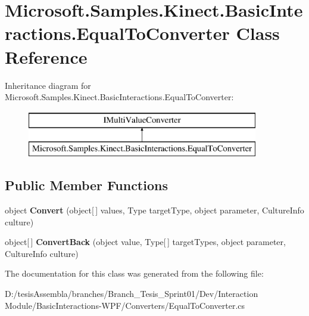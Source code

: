 \hypertarget{class_microsoft_1_1_samples_1_1_kinect_1_1_basic_interactions_1_1_equal_to_converter}{\section{Microsoft.\-Samples.\-Kinect.\-Basic\-Interactions.\-Equal\-To\-Converter Class Reference}
\label{class_microsoft_1_1_samples_1_1_kinect_1_1_basic_interactions_1_1_equal_to_converter}
}
Inheritance diagram for Microsoft.\-Samples.\-Kinect.\-Basic\-Interactions.\-Equal\-To\-Converter\-:\begin{figure}[H]
\begin{center}
\leavevmode
\includegraphics[height=2.000000cm]{class_microsoft_1_1_samples_1_1_kinect_1_1_basic_interactions_1_1_equal_to_converter}
\end{center}
\end{figure}
\subsection*{Public Member Functions}
\begin{DoxyCompactItemize}
\item 
\hypertarget{class_microsoft_1_1_samples_1_1_kinect_1_1_basic_interactions_1_1_equal_to_converter_ac6335934e6980b8338ec43d5fb2e5a23}{object {\bfseries Convert} (object\mbox{[}$\,$\mbox{]} values, Type target\-Type, object parameter, Culture\-Info culture)}\label{class_microsoft_1_1_samples_1_1_kinect_1_1_basic_interactions_1_1_equal_to_converter_ac6335934e6980b8338ec43d5fb2e5a23}

\item 
\hypertarget{class_microsoft_1_1_samples_1_1_kinect_1_1_basic_interactions_1_1_equal_to_converter_a712181f0a2b298255996d3378deec58d}{object\mbox{[}$\,$\mbox{]} {\bfseries Convert\-Back} (object value, Type\mbox{[}$\,$\mbox{]} target\-Types, object parameter, Culture\-Info culture)}\label{class_microsoft_1_1_samples_1_1_kinect_1_1_basic_interactions_1_1_equal_to_converter_a712181f0a2b298255996d3378deec58d}

\end{DoxyCompactItemize}


The documentation for this class was generated from the following file\-:\begin{DoxyCompactItemize}
\item 
D\-:/tesis\-Assembla/branches/\-Branch\-\_\-\-Tesis\-\_\-\-Sprint01/\-Dev/\-Interaction Module/\-Basic\-Interactions-\/\-W\-P\-F/\-Converters/Equal\-To\-Converter.\-cs\end{DoxyCompactItemize}
